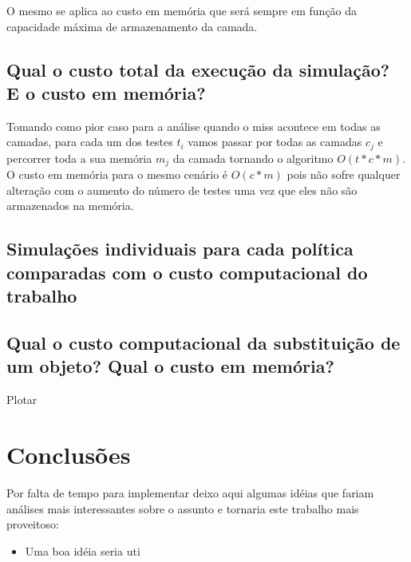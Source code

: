 \documentclass[12pt]{article}
\begin{document}
O mesmo se aplica ao custo em memória que será sempre em função da capacidade
máxima de armazenamento da camada.

\subsection{Qual o custo total da execução da simulação? E o custo em memória?}

Tomando como pior caso para a análise quando o miss acontece em todas as
camadas, para cada um dos testes $t_{i}$ vamos passar por todas as camadas
$c_{j}$ e percorrer toda a sua memória $m_{j}$ da camada tornando o algoritmo
$O(t*c*m)$. O custo em memória para o mesmo cenário é $O(c*m)$ pois não sofre
qualquer alteração com o aumento do número de testes uma vez que eles não são
armazenados na memória.

\subsection{Simulações individuais para cada política comparadas com o custo
computacional do trabalho}

\subsection{Qual o custo computacional da substituição de um objeto? Qual o custo em memória?}
Plotar


\section{Conclusões}
\label{conclusao}

Por falta de tempo para implementar deixo aqui algumas idéias que fariam análises mais interessantes sobre o assunto e tornaria este trabalho mais proveitoso:
\begin{itemize}
  \item Uma boa idéia seria uti
\end{itemize}
\end{document}
